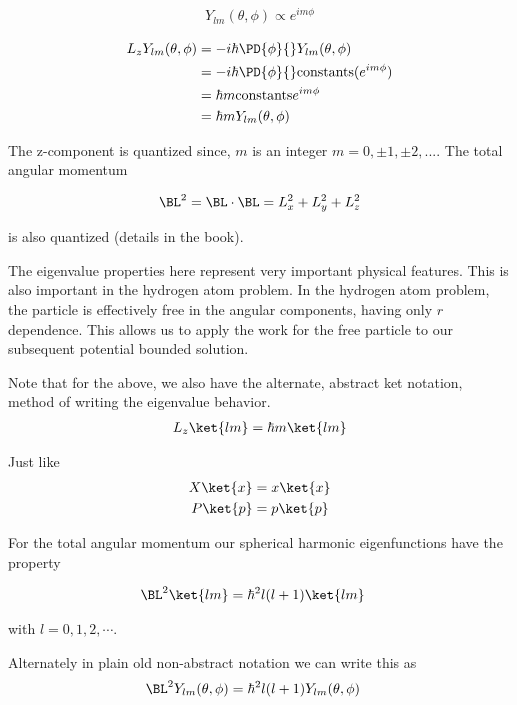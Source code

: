 \begin{align}\label{eqn:PHY356Foct19:1004}
Y_{lm}(\theta, \phi) \propto e^{i m \phi}
\end{align}

\begin{align*}
L_z Y_{lm}(\theta, \phi)
&= -i \hbar \PD{\phi}{} Y_{lm}(\theta, \phi) \\
&= -i \hbar \PD{\phi}{} \text{constants} (e^{im \phi}) \\
&= \hbar m \text{constants} e^{i m \phi} \\
&= \hbar m Y_{lm}(\theta, \phi)
\end{align*}

The z-component is quantized since, $m$ is an integer $m = 0, \pm 1, \pm 2, ...$.  The total angular momentum

\begin{align}\label{eqn:PHY356Foct19:1005}
\BL^2 = \BL \cdot \BL = L_x^2 + L_y^2 + L_z^2
\end{align}

is also quantized (details in the book).

The eigenvalue properties here represent very important physical features.  This is also important in the hydrogen atom problem.  In the hydrogen atom problem, the particle is effectively free in the angular components, having only $r$ dependence.  This allows us to apply the work for the free particle to our subsequent potential bounded solution.

Note that for the above, we also have the alternate, abstract ket notation, method of writing the eigenvalue behavior.
\begin{align}\label{eqn:PHY356Foct19:1006}
L_z \ket{lm} = \hbar m \ket{lm}
\end{align}

Just like
\begin{align}\label{eqn:PHY356Foct19:1007}
X \ket{x} &= x \ket{x} \\
P \ket{p} &= p \ket{p}
\end{align}

For the total angular momentum our spherical harmonic eigenfunctions have the property

\begin{align}\label{eqn:PHY356Foct19:1008}
\BL^2 \ket{lm} &= \hbar^2 l (l + 1)\ket{l m}
\end{align}

with $l = 0, 1, 2, \cdots$.

Alternately in plain old non-abstract notation we can write this as
\begin{align}\label{eqn:PHY356Foct19:1009}
\BL^2 Y_{lm}(\theta, \phi) &= \hbar^2 l (l + 1) Y_{lm}(\theta, \phi)
\end{align}

